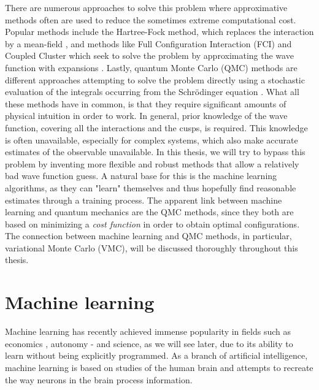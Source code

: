 There are numerous approaches to solve this problem where approximative methods often are used to reduce the sometimes extreme computational cost. Popular methods include the Hartree-Fock method, which replaces the interaction by a mean-field \supercite{hartree_wave_1928, fock_selfconsistent_1930}, and methods like Full Configuration Interaction (FCI) and Coupled Cluster which seek to solve the problem by approximating the wave function with expansions \supercite{daniel_crawford_introduction_2007}. Lastly, quantum Monte Carlo (QMC) methods are different approaches attempting to solve the problem directly using a stochastic evaluation of the integrals occurring from the Schrödinger equation \supercite{bajdich_electronic_2010}. What all these methods have in common, is that they require significant amounts of physical intuition in order to work. In general, prior knowledge of the wave function, covering all the interactions and the cusps, is required. This knowledge is often unavailable, especially for complex systems, which also make accurate estimates of the observable unavailable. In this thesis, we will try to bypass this problem by inventing more flexible and robust methods that allow a relatively bad wave function guess. A natural base for this is the machine learning algorithms, as they can "learn" themselves and thus hopefully find reasonable estimates through a training process. The apparent link between machine learning and quantum mechanics are the QMC methods, since they both are based on minimizing a \textit{cost function} in order to obtain optimal configurations. The connection between machine learning and QMC methods, in particular, variational Monte Carlo (VMC), will be discussed thoroughly throughout this thesis.

\section{Machine learning} \label{sec:machinelearning}
Machine learning has recently achieved immense popularity in fields such as economics \supercite{dube_scalable_2017}, autonomy \supercite{chernova_interactive_2009} - and science, as we will see later, due to its ability to learn without being explicitly programmed. As a branch of artificial intelligence, machine learning is based on studies of the human brain and attempts to recreate the way neurons in the brain process information.

